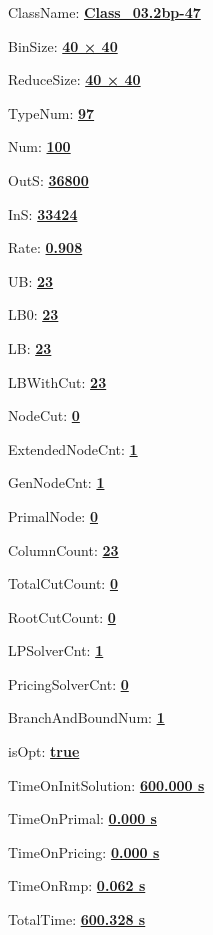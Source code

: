 \documentclass[11pt]{article}
\begin{document}
\pagestyle{empty}


ClassName: \underline{\textbf{Class_03.2bp-47}}
\par
BinSize: \underline{\textbf{40 × 40}}
\par
ReduceSize: \underline{\textbf{40 × 40}}
\par
TypeNum: \underline{\textbf{97}}
\par
Num: \underline{\textbf{100}}
\par
OutS: \underline{\textbf{36800}}
\par
InS: \underline{\textbf{33424}}
\par
Rate: \underline{\textbf{0.908}}
\par
UB: \underline{\textbf{23}}
\par
LB0: \underline{\textbf{23}}
\par
LB: \underline{\textbf{23}}
\par
LBWithCut: \underline{\textbf{23}}
\par
NodeCut: \underline{\textbf{0}}
\par
ExtendedNodeCnt: \underline{\textbf{1}}
\par
GenNodeCnt: \underline{\textbf{1}}
\par
PrimalNode: \underline{\textbf{0}}
\par
ColumnCount: \underline{\textbf{23}}
\par
TotalCutCount: \underline{\textbf{0}}
\par
RootCutCount: \underline{\textbf{0}}
\par
LPSolverCnt: \underline{\textbf{1}}
\par
PricingSolverCnt: \underline{\textbf{0}}
\par
BranchAndBoundNum: \underline{\textbf{1}}
\par
isOpt: \underline{\textbf{true}}
\par
TimeOnInitSolution: \underline{\textbf{600.000 s}}
\par
TimeOnPrimal: \underline{\textbf{0.000 s}}
\par
TimeOnPricing: \underline{\textbf{0.000 s}}
\par
TimeOnRmp: \underline{\textbf{0.062 s}}
\par
TotalTime: \underline{\textbf{600.328 s}}
\par
\newpage


\end{document}
